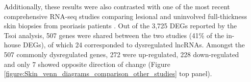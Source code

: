 

Additionally, these results were also contrasted with one of the most recent comprehensive RNA-seq studies comparing lesional and uninvolved full-thickness skin biopsies from psoriasis patients \parencite{Tsoi2015}. Out of the 3,725 DEGs reported by the Tsoi analysis, 507 genes were shared between the two studies (41\% of the in-house DEGs), of which 24 corresponded to dysregulated lncRNAs. Amongst the 507 commonly dysregulated genes, 272 were up-regulated, 228 down-regulated and only 7 showed opposite direction of change (Figure \ref{figure:Skin_venn_diagrams_comparison_other_studies} top panel). %

